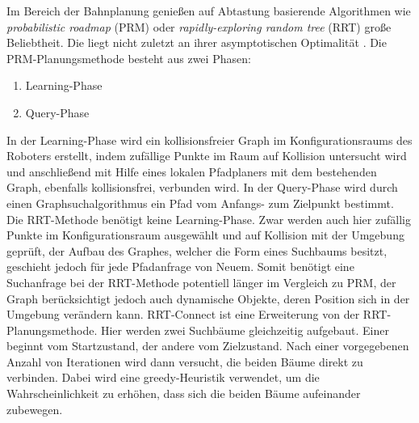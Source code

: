 Im Bereich der Bahnplanung genießen auf Abtastung basierende Algorithmen wie \textit{probabilistic roadmap} (PRM) oder \textit{rapidly-exploring random tree} (RRT) große Beliebtheit. Die liegt nicht zuletzt an ihrer asymptotischen Optimalität \cite{SamplingAlgos}.
\newline
Die PRM-Planungsmethode \cite{PRM} besteht aus zwei Phasen:
\begin{enumerate}
	\item Learning-Phase
	\item Query-Phase
\end{enumerate}
In der Learning-Phase wird ein kollisionsfreier Graph im Konfigurationsraums des Roboters erstellt, indem zufällige Punkte im Raum auf Kollision untersucht wird und anschließend mit Hilfe eines lokalen Pfadplaners mit dem bestehenden Graph, ebenfalls kollisionsfrei, verbunden wird. In der Query-Phase wird durch einen Graphsuchalgorithmus ein Pfad vom Anfangs- zum Zielpunkt bestimmt.
\newline
Die RRT-Methode \cite{RRT} benötigt keine Learning-Phase. Zwar werden auch hier zufällig Punkte im Konfigurationsraum ausgewählt und auf Kollision mit der Umgebung geprüft, der Aufbau des Graphes, welcher die Form eines Suchbaums besitzt, geschieht jedoch für jede Pfadanfrage von Neuem. Somit benötigt eine Suchanfrage bei der RRT-Methode potentiell länger im Vergleich zu PRM, der Graph berücksichtigt jedoch auch dynamische Objekte, deren Position sich in der Umgebung verändern kann.
\newline
RRT-Connect \cite{RRTConnect} ist eine Erweiterung von der RRT-Planungsmethode. Hier werden zwei Suchbäume gleichzeitig aufgebaut. Einer beginnt vom Startzustand, der andere vom Zielzustand. Nach einer vorgegebenen Anzahl von Iterationen wird dann versucht, die beiden Bäume direkt zu verbinden. Dabei wird eine greedy-Heuristik verwendet, um die Wahrscheinlichkeit zu erhöhen, dass sich die beiden Bäume aufeinander zubewegen.
